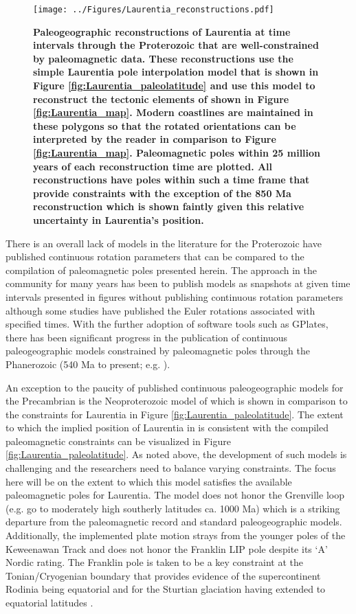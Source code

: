 \documentclass[11pt,letterpaper]{article}
\begin{document}
\begin{figure}
\centering
\texttt{[image: ../Figures/Laurentia\_reconstructions.pdf]}
\caption{\small{\textbf{Paleogeographic reconstructions of Laurentia at time intervals through the Proterozoic that are well-constrained by paleomagnetic data. These reconstructions use the simple Laurentia pole interpolation model that is shown in Figure \ref{fig:Laurentia_paleolatitude} and use this model to reconstruct the tectonic elements of \cite{Whitmeyer2007a} shown in Figure \ref{fig:Laurentia_map}. Modern coastlines are maintained in these polygons so that the rotated orientations can be interpreted by the reader in comparison to Figure \ref{fig:Laurentia_map}. Paleomagnetic poles within 25 million years of each reconstruction time are plotted. All reconstructions have poles within such a time frame that provide constraints with the exception of the 850 Ma reconstruction which is shown faintly given this relative uncertainty in Laurentia's position.}}}
\label{fig:Laurentia_reconstructions}
\end{figure} 

There is an overall lack of models in the literature for the Proterozoic have published continuous rotation parameters that can be compared to the compilation of paleomagnetic poles presented herein. The approach in the community for many years has been to publish models as snapshots at given time intervals presented in figures without publishing continuous rotation parameters although some studies have published the Euler rotations associated with specified times. With the further adoption of software tools such as GPlates, there has been significant progress in the publication of continuous paleogeographic models constrained by paleomagnetic poles through the Phanerozoic (540 Ma to present; e.g. \citealp{Torsvik2012a}).
 
An exception to the paucity of published continuous paleogeographic models for the Precambrian is the Neoproterozoic model of \cite{Merdith2017b} which is shown in comparison to the constraints for Laurentia in Figure \ref{fig:Laurentia_paleolatitude}. The extent to which the implied position of Laurentia in \cite{Merdith2017b} is consistent with the compiled paleomagnetic constraints can be visualized in Figure \ref{fig:Laurentia_paleolatitude}. As noted above, the development of such models is challenging and the researchers need to balance varying constraints. The focus here will be on the extent to which this model satisfies the available paleomagnetic poles for Laurentia. The model does not honor the Grenville loop (e.g. go to moderately high southerly latitudes ca. 1000 Ma) which is a striking departure from the paleomagnetic record and standard paleogeographic models. Additionally, the implemented plate motion strays from the younger poles of the Keweenawan Track and does not honor the Franklin LIP pole \cite{Denyszyn2009b} despite its `A' Nordic rating. The Franklin pole is taken to be a key constraint at the Tonian/Cryogenian boundary that provides evidence of the supercontinent Rodinia being equatorial and for the Sturtian glaciation having extended to equatorial latitudes \citep{Macdonald2010a}.
\end{document}
